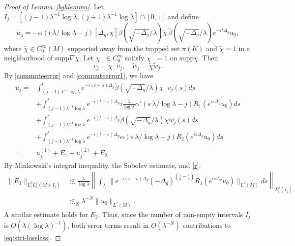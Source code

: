 \documentclass[10pt]{amsart}
\newcommand{\la}{\lambda}
\newcommand{\supp}{\mathrm{supp }}
\newcommand{\1}{{\bf 1}}
\begin{document}
\begin{proof}[Proof of Lemma~\ref{bghlemma}]
 
Let $I_j=[(j-1)\la^{-1}\log\la, (j+1)\la^{-1}\log\la]\cap [0,1]$ and define
     \begin{equation}\label{oj}
  \tilde w_j=-\alpha(t\,\la /\log \la-j)[\Delta_g,\chi]\beta(\sqrt{-\Delta_g}/\la)\tilde\chi \,\tilde\beta(\sqrt{-\Delta_g}/\la)e^{-it\Delta_g}u_0,
    \end{equation}
  where  $\tilde \chi\in C_0^\infty(M)$ supported away from the trapped set $\pi(K)$ and $\tilde\chi=1$ in a neighborhood of $\supp \nabla\chi$.
 Let $\chi_-\in C_0^{\infty}$ satisfy $\chi_-=1$ on $\supp \chi$. Then 
    \begin{equation*}
    v_j=\chi_-v_j,\quad \tilde w_j=\tilde \chi\tilde w_j.
    \end{equation*}
By \eqref{commuteerror} and \eqref{commuteerror1}, we have 
\begin{equation}
\begin{aligned}
      u_j=&\int_{(j-1)\la^{-1}\log \la}^{t}e^{-i(t-s)\Delta_g}\tilde\beta(\sqrt{-\Delta_g}/\la)\chi_-v_j(s) ds\\
            &+  \int_{(j-1)\la^{-1}\log\la}^{t}e^{-i(t-s)\Delta_g} i\frac{\la}{\log \la}\alpha'(s\,\la /\log \la-j) R_1(e^{is\Delta_g}u_0)ds \\
      &+ \int_{(j-1)\la^{-1}\log\la}^{t}e^{-i(t-s)\Delta_g}\tilde\beta(\sqrt{-\Delta_g}/\la)\tilde \chi\tilde w_j(s)ds \\
      &+  \int_{(j-1)\la^{-1}\log\la}^{t}e^{-i(t-s)\Delta_g}\alpha(s\,\la /\log \la-j) R_2(e^{is\Delta_g}u_0)ds\\
      =& u_j^{(1)}+E_1+ u_j^{(2)}+E_2
\end{aligned}
\end{equation}
By Minkowski’s integral inequality, the Sobolev estimate, and \eqref{r},
\begin{equation}
\begin{aligned}
      \|E_1\|_{L_t^p L_x^q(M\times I_j)}&\lesssim \frac{\la}{\log \la}\left\|\int_{I_j} \|e^{-i(t-s)\Delta_g}(-\Delta_g)^{(\frac12-\frac1q)}R_1(e^{is\Delta_g}u_0)\|_{L^2(M)} ds\right\|_{L^p_t(I_j)} \\
      &\lesssim_N\la^{-N}\|u_0\|_{L^2(M)}.  
\end{aligned}
\end{equation}
A similar estimate holds for $E_2$. Thus, since the number of non-empty intervals $I_j$ is $O(\la(\log\la)^{-1})$, both error terms result in $O(\la^{-N})$ contributions to \eqref{eq:stri-lossless}.
    

\end{proof}
\end{document}
